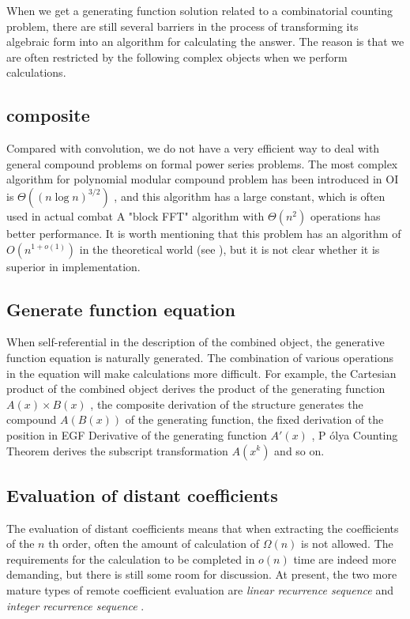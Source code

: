 When we get a generating function solution related to a combinatorial counting problem, there are still several barriers in the process of transforming its algebraic form into an algorithm for calculating the answer. The reason is that we are often restricted by the following complex objects when we perform calculations.

\subsection { composite }

Compared with convolution, we do not have a very efficient way to deal with general compound problems on formal power series problems. The most complex algorithm for polynomial modular compound problem has been introduced in OI is $ \Theta ((n \log n)^{3/2}) $ , and this algorithm has a large constant, which is often used in actual combat A "block FFT" algorithm with $ \Theta (n^ 2 ) $ operations has better performance. It is worth mentioning that this problem has an algorithm of $ O(n^{1+o(1)}) $ in the theoretical world (see \cite { polyfact }), but it is not clear whether it is superior in implementation.

\subsection { Generate function equation }

When self-referential in the description of the combined object, the generative function equation is naturally generated. The combination of various operations in the equation will make calculations more difficult. For example, the Cartesian product of the combined object derives the product of the generating function $ A(x) \times B(x) $ , the composite derivation of the structure generates the compound $ A(B(x)) $ of the generating function, the fixed derivation of the position in EGF Derivative of the generating function $ A'(x) $ , P \' olya Counting Theorem derives the subscript transformation $ A(x^k) $ and so on.

\subsection { Evaluation of distant coefficients }

The evaluation of distant coefficients means that when extracting the coefficients of the $ n $ th order, often the amount of calculation of $ \Omega (n) $ is not allowed. The requirements for the calculation to be completed in $ o(n) $ time are indeed more demanding, but there is still some room for discussion. At present, the two more mature types of remote coefficient evaluation are \emph { linear recurrence sequence } and \emph { integer recurrence sequence }.

